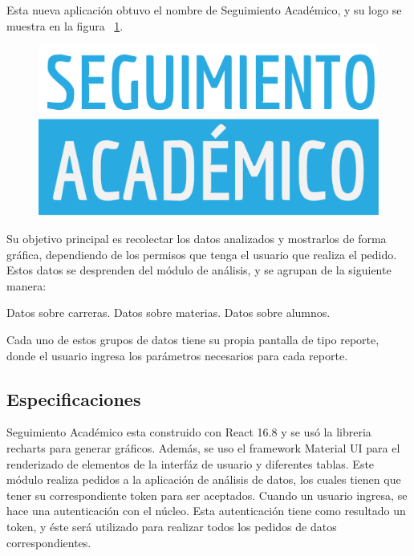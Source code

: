Esta nueva aplicación obtuvo el nombre de Seguimiento Académico, y su logo se muestra en la figura ~\ref{fig:seguimiento-academico-logo}.

\begin{figure}[h!]
  \centering
    \includegraphics[scale=0.5]{images/seguimiento-academico/seguimiento-academico-blanco.png}
  \label{fig:seguimiento-academico-logo}
\end{figure}

Su objetivo principal es recolectar los datos analizados y mostrarlos de forma gráfica, dependiendo de los permisos que tenga el usuario que realiza el pedido.
Estos datos se desprenden del módulo de análisis, y se agrupan de la siguiente manera:

\begin{outline}
\2 Datos sobre carreras.
\2 Datos sobre materias.
\2 Datos sobre alumnos.
\end{outline}

Cada uno de estos grupos de datos tiene su propia pantalla de tipo reporte, donde el usuario ingresa los parámetros necesarios para cada reporte.


\subsection{Especificaciones}

Seguimiento Académico esta construido con React 16.8 y se usó la libreria recharts para generar gráficos. Además, se uso el framework Material UI para el renderizado de elementos de la interfáz de usuario y diferentes tablas.
Este módulo realiza pedidos a la aplicación de análisis de datos, los cuales tienen que tener su correspondiente token para ser aceptados.
Cuando un usuario ingresa, se hace una autenticación con el núcleo. Esta autenticación tiene como resultado un token, y éste será utilizado para realizar todos los pedidos de datos correspondientes.

